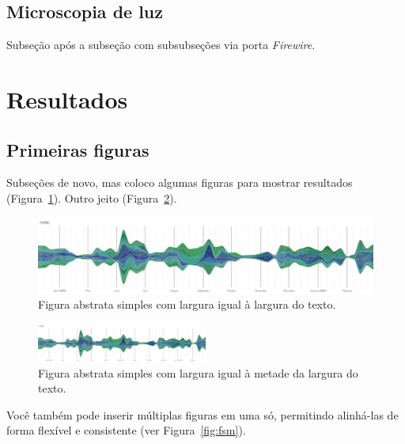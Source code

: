 \subsection{Microscopia de luz}\label{cap2:mem:micro}

Subseção após a subseção com subsubseções via porta \emph{Firewire}.

\section{Resultados}\label{cap2:res}

\subsection{Primeiras figuras}\label{cap2:res:figs}

Subseções de novo, mas coloco algumas figuras para mostrar resultados (Figura~\ref{fig:last}). Outro jeito (Figura~\ref{fig:last2}).

\begin{figure}[htbp]
  \centering
  \includegraphics[width=\textwidth]{lastgraph}
  \caption[Figura simples]{Figura abstrata simples com largura igual à largura do texto.}
  \label{fig:last}
\end{figure}

\begin{figure}[htbp]
  \centering
  \includegraphics[width=0.5\textwidth]{lastgraph}
  \caption[Outra figura simples]{Figura abstrata simples com largura igual à metade da largura do texto.}
  \label{fig:last2}
\end{figure}

Você também pode inserir múltiplas figuras em uma só, permitindo alinhá-las de forma flexível e consistente (ver Figura~\ref{fig:fsm}).

